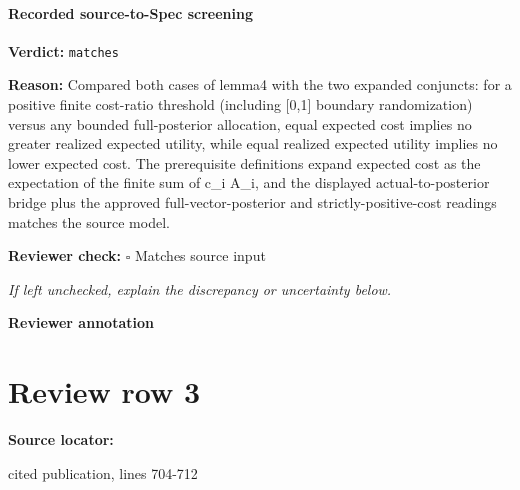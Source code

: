 \documentclass[10pt]{article}
\newcommand{\reviewerbox}{%
  \par\noindent\fbox{\parbox{0.96\linewidth}{\rule{0pt}{0.38in}}}\par
}
\newcommand{\reviewmatch}[1]{%
  \par\noindent\textbf{Reviewer check:} $\square$\; #1\par
  \noindent\emph{If left unchecked, explain the discrepancy or uncertainty below.}\par
}
\begin{document}
\paragraph{Recorded source-to-Spec screening}
\textbf{Verdict:} \texttt{matches}
\\
{\raggedright
\textbf{Reason:} Compared both cases of lemma4 with the two expanded conjuncts:\allowbreak{} for a positive finite cost-\allowbreak{}ratio threshold (including [0,1] boundary randomization) versus any bounded full-\allowbreak{}posterior allocation, equal expected cost implies no greater realized expected utility, while equal realized expected utility implies no lower expected cost.\allowbreak{} The prerequisite definitions expand expected cost as the expectation of the finite sum of c\_\allowbreak{}i A\_\allowbreak{}i, and the displayed actual-\allowbreak{}to-\allowbreak{}posterior bridge plus the approved full-\allowbreak{}vector-\allowbreak{}posterior and strictly-\allowbreak{}positive-\allowbreak{}cost readings matches the source model.\allowbreak{}
\par}
\reviewmatch{Matches source input}
\noindent\textbf{Reviewer annotation}\par
\reviewerbox
\clearpage
\hypertarget{source-claim-1f8a655d78591844}{}
\section*{Review row 3}
\textbf{Source locator:} {\footnotesize\raggedright cited publication, lines 704-\allowbreak{}712\par}
\end{document}

